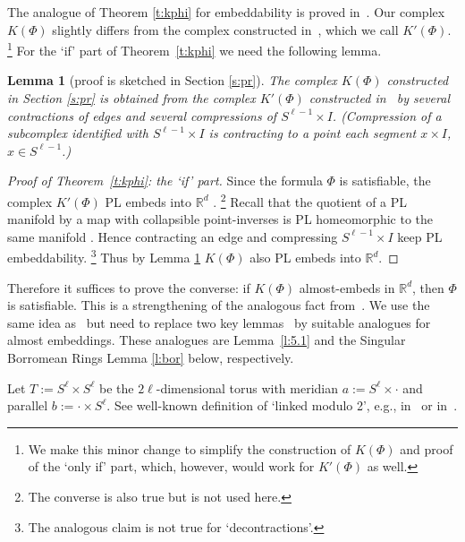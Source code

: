 \documentclass[runningheads]{llncs}
\newtheorem{lemma}[theorem]{Lemma}
\theoremstyle{remark}
\theoremstyle{definition}
\newcommand{\R}{\mathbb{R}}
\begin{document}
The analogue of Theorem \ref{t:kphi} for embeddability is proved in~\cite[\S4, \S5]{MaTaWa11}.
Our complex $K(\Phi)$ slightly differs from the complex constructed in~\cite[\S4.2, \S5.2]{MaTaWa11},
which we call $K'(\Phi)$.%
\footnote{We make this minor change to simplify the construction of $K(\Phi)$ and proof of the `only if' part,
which, however, would work for $K'(\Phi)$ as well.}
For the `if' part of Theorem~\ref{t:kphi} we need the following lemma.

\begin{lemma}[proof is sketched in  Section \ref{s:pr}]\label{l:comp}
The complex $K(\Phi)$ constructed in Section \ref{s:pr} is obtained from the complex $K'(\Phi)$ constructed
in~\cite[\S4.2, \S5.2]{MaTaWa11} by several contractions of edges and several compressions of $S^{\ell-1}\times I$.
(Compression of a subcomplex identified with $S^{\ell-1}\times I$ is contracting to a point each segment $x\times I$, $x\in S^{\ell-1}$.)
\end{lemma}

\begin{proof}[Proof of Theorem~\ref{t:kphi}: the `if' part]
Since the formula $\Phi$ is satisfiable, the complex $K'(\Phi)$ PL embeds into $\R^d$ \cite[Section 5]{MaTaWa11}.%
\footnote{The converse is also true but is not used here.}
Recall that the quotient of a PL manifold by a map with collapsible point-inverses is PL homeomorphic to the same manifold \cite{Co67}.
Hence contracting an edge and
compressing $S^{\ell-1}\times I$ keep PL embeddability.%
\footnote{The analogous claim is not true for `decontractions'.}
Thus by Lemma \ref{l:comp} $K(\Phi)$ also PL embeds into $\R^d$.
\end{proof}

Therefore it suffices to prove the converse: if $K(\Phi)$ almost-embeds in $\R^d$, then $\Phi$ is satisfiable.
This is a strengthening of the analogous fact from~\cite{MaTaWa11}.
We use the same idea as~\cite{MaTaWa11} but need to replace two key lemmas~\cite[Lemmas~5.1(i) and~5.3(i)]{MaTaWa11}
by suitable analogues for almost embeddings.
These analogues are Lemma~\ref{l:5.1} and the Singular Borromean Rings Lemma \ref{l:bor} \cite[Lemma 1.9]{AMSW}
below, respectively.

Let  $T:=S^\ell\times S^\ell$ be the $2\ell$-dimensional torus with meridian $a:=S^\ell\times \cdot$ and parallel $b:=\cdot\times S^\ell$.
See well-known definition of `linked modulo 2', e.g.,
in~\cite[\S77]{SeTh80} or in~\cite[\S2.2 `Linking modulo 2']{Sk}.
\end{document}
